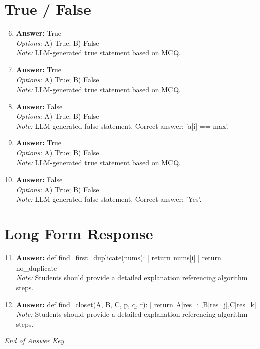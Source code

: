 \documentclass[12pt]{article}
\begin{document}
\section*{True / False}
\begin{enumerate}[label=\arabic*.]
\setcounter{enumi}{5}
\item \textbf{Answer:} True
\\ \textit{Options:} A) True; B) False
\\ \textit{Note:} LLM-generated true statement based on MCQ.
\item \textbf{Answer:} True
\\ \textit{Options:} A) True; B) False
\\ \textit{Note:} LLM-generated true statement based on MCQ.
\item \textbf{Answer:} False
\\ \textit{Options:} A) True; B) False
\\ \textit{Note:} LLM-generated false statement. Correct answer: 'a[i] == max'.
\item \textbf{Answer:} True
\\ \textit{Options:} A) True; B) False
\\ \textit{Note:} LLM-generated true statement based on MCQ.
\item \textbf{Answer:} False
\\ \textit{Options:} A) True; B) False
\\ \textit{Note:} LLM-generated false statement. Correct answer: 'Yes'.
\end{enumerate}

\section*{Long Form Response}
\begin{enumerate}[label=\arabic*.]
\setcounter{enumi}{10}
\item \textbf{Answer:} def find\_first\_duplicate(nums): | return nums[i] | return no\_duplicate
\\ \textit{Note:} Students should provide a detailed explanation referencing algorithm steps.
\item \textbf{Answer:} def find\_closet(A, B, C, p, q, r): | return A[res\_i],B[res\_j],C[res\_k]
\\ \textit{Note:} Students should provide a detailed explanation referencing algorithm steps.
\end{enumerate}

\vfill
\noindent\textit{End of Answer Key}
\end{document}
